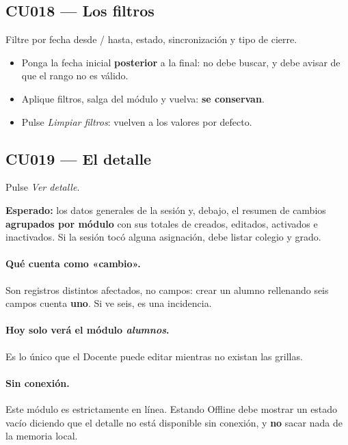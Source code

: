 \documentclass[11pt,a4paper]{article}
\begin{document}
\subsection{CU018 --- Los filtros}

Filtre por fecha desde / hasta, estado, sincronización y tipo de cierre.

\begin{itemize}
  \item Ponga la fecha inicial \textbf{posterior} a la final: no debe buscar, y
        debe avisar de que el rango no es válido.
  \item Aplique filtros, salga del módulo y vuelva: \textbf{se conservan}.
  \item Pulse \emph{Limpiar filtros}: vuelven a los valores por defecto.
\end{itemize}

\subsection{CU019 --- El detalle}

Pulse \emph{Ver detalle}.

\textbf{Esperado:} los datos generales de la sesión y, debajo, el resumen de
cambios \textbf{agrupados por módulo} con sus totales de creados, editados,
activados e inactivados. Si la sesión tocó alguna asignación, debe listar
colegio y grado.

\paragraph{Qué cuenta como «cambio».} Son registros distintos afectados, no
campos: crear un alumno rellenando seis campos cuenta \textbf{uno}. Si ve seis,
es una incidencia.

\paragraph{Hoy solo verá el módulo \emph{alumnos}.} Es lo único que el Docente
puede editar mientras no existan las grillas.

\paragraph{Sin conexión.} Este módulo es estrictamente en línea. Estando Offline
debe mostrar un estado vacío diciendo que el detalle no está disponible sin
conexión, y \textbf{no} sacar nada de la memoria local.
\end{document}
